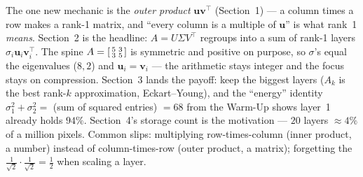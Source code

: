 \documentclass[10pt]{article}
\newcommand{\uu}{\mathbf{u}}
\newcommand{\vv}{\mathbf{v}}
\newcommand{\T}{^{\top}}
\begin{document}
\begin{teachernote}
The one new mechanic is the \emph{outer product} $\uu\vv\T$ (Section~1) --- a column times a row makes a
rank-1 matrix, and ``every column is a multiple of $\uu$'' is what rank~1 \emph{means}. Section~2 is the
headline: $A=U\Sigma V\T$ regroups into a sum of rank-1 layers $\sigma_i\uu_i\vv_i\T$. The spine
$A=\begin{bsmallmatrix} 5 & 3\\ 3 & 5 \end{bsmallmatrix}$ is symmetric and positive on purpose, so
$\sigma$'s equal the eigenvalues ($8,2$) and $\uu_i=\vv_i$ --- the arithmetic stays integer and the focus
stays on compression. Section~3 lands the payoff: keep the biggest layers ($A_k$ is the best rank-$k$
approximation, Eckart--Young), and the ``energy'' identity $\sigma_1^2+\sigma_2^2=$ (sum of squared
entries) $=68$ from the Warm-Up shows layer~1 already holds $94\%$. Section~4's storage count is the
motivation --- $20$ layers $\approx4\%$ of a million pixels. Common slips: multiplying row-times-column
(inner product, a number) instead of column-times-row (outer product, a matrix); forgetting the
$\tfrac1{\sqrt2}\cdot\tfrac1{\sqrt2}=\tfrac12$ when scaling a layer.
\end{teachernote}
\end{document}
